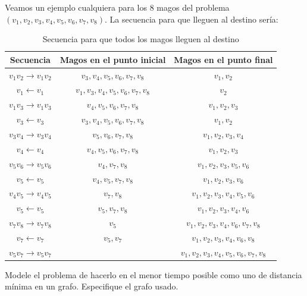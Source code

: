 \documentclass[letterpaper,10pt,table, dvipsnames]{article}
\begin{document}
Veamos un ejemplo cualquiera para los 8 magos del problema $(v_1,v_2,v_3,v_4,v_5,v_6,v_7,v_8)$. La secuencia para que lleguen al destino sería:
\begin{table}[htbp]
  \centering
  \caption{Secuencia para que todos los magos lleguen al destino}
\begin{tabular}{|c||c||c|}\hline
Secuencia & Magos en el punto inicial & Magos en el punto final \\\hline 
    $v_1v_2 \rightarrow v_1v_2$ & $v_3,v_4,v_5,v_6,v_7,v_8$ & $v_1,v_2$ \\\hline
  $  v_1 \leftarrow v_1$ & $v_1,v_3,v_4,v_5,v_6,v_7,v_8$ & $v_2$ \\\hline
    $v_1v_3 \rightarrow v_1v_3$ & $v_4,v_5,v_6,v_7,v_8$ & $v_1,v_2,v_3$ \\\hline
  $  v_3 \leftarrow v_3 $ & $v_3,v_4,v_5,v_6,v_7,v_8$ & $v_1,v_2$ \\\hline
    $v_3v_4 \rightarrow v_3v_4$ & $v_5,v_6,v_7,v_8$ & $v_1,v_2,v_3,v_4$ \\\hline
  $  v_4 \leftarrow v_4 $ & $v_4,v_5,v_6,v_7,v_8$ & $v_1,v_2,v_3$ \\\hline
    $v_5v_6 \rightarrow v_5v_6$ & $v_4,v_7,v_8$ & $v_1,v_2,v_3,v_5,v_6$ \\\hline
  $  v_5 \leftarrow v_5 $ & $v_4,v_5,v_7,v_8$ & $v_1,v_2,v_3,v_6$ \\\hline
    $v_4v_5 \rightarrow v_4v_5$ & $v_7,v_8$ & $v_1,v_2,v_3,v_4,v_5,v_6$ \\\hline
  $  v_5 \leftarrow v_5 $ & $v_5,v_7,v_8$ & $v_1,v_2,v_3,v_4,v_6$ \\\hline
    $v_7v_8 \rightarrow v_7v_8$ & $v_5$ & $v_1,v_2,v_3,v_4,v_6,v_7,v_8$ \\\hline
  $  v_7 \leftarrow v_7 $ & $v_5,v_7$ & $v_1,v_2,v_3,v_4,v_6,v_8$ \\\hline
    $v_5v_7 \rightarrow v_5v_7$ &  & $v_1,v_2,v_3,v_4,v_5,v_6,v_7,v_8$ \\\hline
\end{tabular}
\label{tab:secuencia}
\end{table}

\newpage

\begin{tcolorbox}
 Modele el problema de hacerlo en el menor tiempo posible como uno de distancia mínima en un grafo. Especifique el grafo usado.
\end{tcolorbox}
\end{document}
